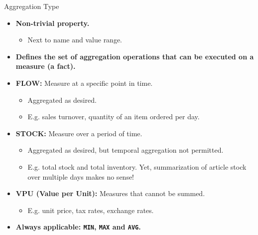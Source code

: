 \begin{frame}{Aggregation Type}
	\begin{itemize}
		\item \textbf{Non-trivial property.}
		      \begin{itemize}
			      \item Next to name and value range.
		      \end{itemize}
		\item \textbf{Defines the set of aggregation operations that can be executed on a measure (a fact).}
		\item \textbf{\color{airforceblue}FLOW:} Measure at a specific point in time.
		      \begin{itemize}
			      \item Aggregated as desired.
			      \item E.g. sales turnover, quantity of an item ordered per day.
		      \end{itemize}
		\item \textbf{\color{airforceblue}STOCK:} Measure over a period of time.
		      \begin{itemize}
			      \item Aggregated as desired, but temporal aggregation not permitted.
			      \item E.g. total stock and total inventory. Yet, summarization of article stock over multiple days makes no sense!
		      \end{itemize}
		\item \textbf{\color{airforceblue}VPU (Value per Unit):} Measures that cannot be summed.
		      \begin{itemize}
			      \item E.g. unit price, tax rates, exchange rates.
		      \end{itemize}
		\item \textbf{Always applicable: \texttt{MIN}, \texttt{MAX} and \texttt{AVG}.}
	\end{itemize}
\end{frame}

